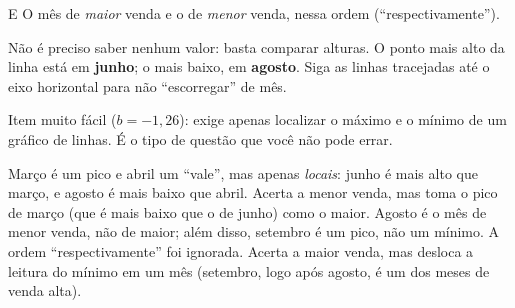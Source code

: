 \begin{resolucao}{E}
 O mês de \emph{maior} venda e o de \emph{menor} venda, nessa ordem (“respectivamente”).

 Não é preciso saber nenhum valor: basta comparar alturas. O ponto mais alto da linha está em \textbf{junho}; o mais baixo, em \textbf{agosto}. Siga as linhas tracejadas até o eixo horizontal para não “escorregar” de mês.


Item muito fácil ($b=-1{,}26$): exige apenas localizar o máximo e o mínimo de um gráfico de linhas. É o tipo de questão que você não pode errar.
\begin{distratores}
 Março é um pico e abril um “vale”, mas apenas \emph{locais}: junho é mais alto que março, e agosto é mais baixo que abril.
 Acerta a menor venda, mas toma o pico de março (que é mais baixo que o de junho) como o maior.
 Agosto é o mês de menor venda, não de maior; além disso, setembro é um pico, não um mínimo. A ordem “respectivamente” foi ignorada.
 Acerta a maior venda, mas desloca a leitura do mínimo em um mês (setembro, logo após agosto, é um dos meses de venda alta).
\end{distratores}
\end{resolucao}

